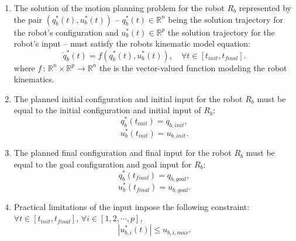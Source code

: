 \documentclass[eprint]{actapoly}
\begin{document}
\begin{enumerate}

    \item The solution of the motion planning problem
    for the robot $R_b$ represented by the pair
    $(q^{*}_b(t), u^{*}_b(t))$ --
    $q^{*}_b(t) \in \mathbb{R}^n$ being the solution trajectory for
    the robot's configuration and $u^{*}_b(t) \in \mathbb{R}^p$ the solution
    trajectory for the robot's input -- must satisfy the
    robots kinematic model equation:
    \begin{equation}\label{eq:kinematic}
        \dot{q}^{*}_b(t) = f(q^{*}_b(t),u^{*}_b(t)),\quad \forall t \in [t_{init}, t_{final}].
    \end{equation}
    where \mbox{$f\,:\,\mathbb{R}^{n}\times \mathbb{R}^{p}\rightarrow \mathbb{R}^n$} the
	is the vector-valued function modeling the robot kinematics.
%	
    
    \item The planned initial configuration and initial 
    input for the robot $R_b$ must
    be equal to the initial configuration and initial
    input of $R_b$:
    \begin{equation}
        q^{*}_{b}(t_{init}) = q_{b,init},
    \end{equation}
    \begin{equation}
        u^{*}_{b}(t_{init}) = u_{b,init}.
    \end{equation}

    \item The planned final configuration and final 
    input for the robot $R_b$ must
    be equal to the goal configuration and goal
    input for $R_b$:
    \begin{equation}\label{eq:finalconfig}
        q^{*}_{b}(t_{final}) = q_{b,goal},
    \end{equation}
    \begin{equation}\label{eq:finalinput}
        u^{*}_{b}(t_{final}) = u_{b,goal}.
    \end{equation}

    \item Practical limitations of the input impose
    the following constraint: $\forall t \in [t_{init}, t_{final}]$, $\forall i \in [1,2,\cdots, p]$,
    \begin{equation}
        |u^{*}_{b,i}(t)| \leq u_{b,i,max}.
    \end{equation}
    

\end{enumerate}
\end{document}

